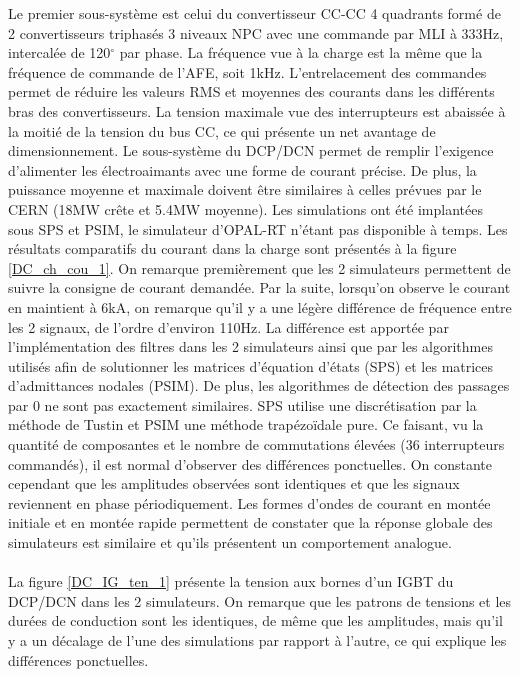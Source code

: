 Le premier sous-système est celui du convertisseur CC-CC 4 quadrants formé de 2 convertisseurs triphasés 3 niveaux NPC avec une commande par MLI à 333Hz, intercalée de 120$^\circ$ par phase. La fréquence vue à la charge est la même que la fréquence de commande de l'AFE, soit 1kHz. L'entrelacement  des commandes permet de réduire les valeurs RMS et moyennes des courants dans les différents bras des convertisseurs. La tension maximale vue des interrupteurs est abaissée à la moitié de la tension du bus CC, ce qui présente un net avantage de dimensionnement. Le sous-système du DCP/DCN permet de remplir l'exigence d'alimenter les électroaimants avec une forme de courant précise. De plus, la puissance moyenne et maximale doivent être similaires à celles prévues par le CERN (18MW crête et 5.4MW moyenne). Les simulations ont été implantées sous SPS et PSIM, le simulateur d'OPAL-RT n'étant pas disponible à temps. Les résultats comparatifs du courant dans la charge sont présentés à la figure \ref{DC_ch_cou_1}. On remarque premièrement que les 2 simulateurs permettent de suivre la consigne de courant demandée. Par la suite, lorsqu'on observe le courant en maintient à 6kA, on remarque qu'il y a une légère différence de fréquence entre les 2 signaux, de l'ordre d'environ 110Hz. La différence est apportée par l'implémentation des filtres dans les 2 simulateurs ainsi que par les algorithmes utilisés afin de solutionner les matrices d'équation d'états (SPS) et les matrices d'admittances nodales (PSIM). De plus, les algorithmes de détection des passages par 0 ne sont pas exactement similaires. SPS utilise une discrétisation par la méthode de Tustin et PSIM une méthode trapézoïdale pure. Ce faisant, vu la quantité de composantes et le nombre de commutations élevées (36 interrupteurs commandés), il est normal d'observer des différences ponctuelles. On constante cependant que les amplitudes observées sont identiques et que les signaux reviennent en phase périodiquement. Les formes d'ondes de courant en montée initiale et en montée rapide permettent de constater que la réponse globale des simulateurs est similaire et qu'ils présentent un comportement analogue.

\paragraph{} La figure \ref{DC_IG_ten_1} présente la tension aux bornes d'un IGBT du DCP/DCN dans les 2 simulateurs. On remarque que les patrons de tensions et les durées de conduction sont les identiques, de même que les amplitudes, mais qu'il y a un décalage de l'une des simulations par rapport à l'autre, ce qui explique les différences ponctuelles. 

